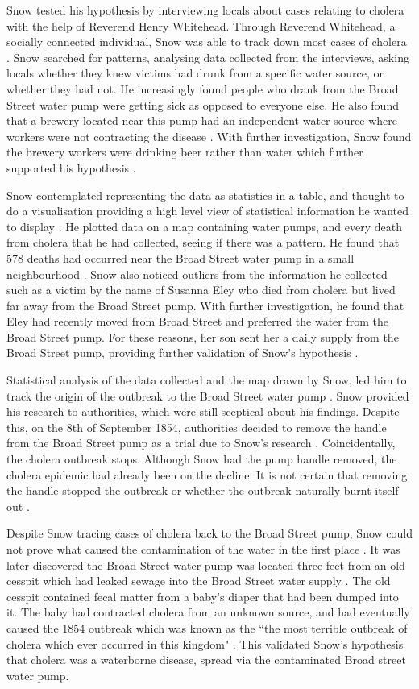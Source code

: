 \documentclass[12pt]{article}
\begin{document}
Snow tested his hypothesis by interviewing locals about cases relating to cholera with the help of Reverend Henry Whitehead. Through Reverend Whitehead, a socially connected individual, Snow was able to track down most cases of cholera \cite{tedtalk}. Snow searched for patterns, analysing data collected from the interviews, asking locals whether they knew victims had drunk from a specific water source, or whether they had not. He increasingly found people who drank from the Broad Street water pump were getting sick as opposed to everyone else. He also found that a brewery located near this pump had an independent water source where workers were not contracting the disease \cite{blog}. With further investigation, Snow found the brewery workers were drinking beer rather than water which further supported his hypothesis \cite{youtube}.

Snow contemplated representing the data as statistics in a table, and thought to do a visualisation providing a high level view of statistical information he wanted to display \cite{tedtalk}. He plotted data on a map containing water pumps, and every death from cholera that he had collected, seeing if there was a pattern. He found that 578 deaths had occurred near the Broad Street water pump in a small neighbourhood \cite{channel1}. Snow also noticed outliers from the information he collected such as a victim by the name of Susanna Eley who died from cholera but lived far away from the Broad Street pump. With further investigation, he found that Eley had recently moved from Broad Street and preferred the water from the Broad Street pump. For these reasons, her son sent her a daily supply from the Broad Street pump, providing further validation of Snow's hypothesis \cite{channel1}. 

Statistical analysis of the data collected and the map drawn by Snow, led him to track the origin of the outbreak to the Broad Street water pump \cite{test}.
Snow provided his research to authorities, which were still sceptical about his findings. Despite this, on the 8th of September 1854, authorities decided to remove the handle from the Broad Street pump as a trial due to Snow's research \cite{ucla, youtube}. Coincidentally, the cholera outbreak stops. Although Snow had the pump handle removed, the cholera epidemic had already been on the decline. It is not certain that removing the handle stopped the outbreak or whether the outbreak naturally burnt itself out \cite{original}.

Despite Snow tracing cases of cholera back to the Broad Street pump, Snow could not prove what caused the contamination of the water in the first place \cite{ucla}. It was later discovered the Broad Street water pump was located three feet from an old cesspit which had leaked sewage into the Broad Street water supply \cite{channel1, heros}. The old cesspit contained fecal matter from a baby's diaper that had been dumped into it. The baby had contracted cholera from an unknown source, and had eventually caused the 1854 outbreak which was known as the ``the most terrible outbreak of cholera which ever occurred in this kingdom" \cite{ucla, heros, tedtalk, johnson}. This validated Snow's hypothesis that cholera was a waterborne disease, spread via the contaminated Broad street water pump. 
\end{document}
